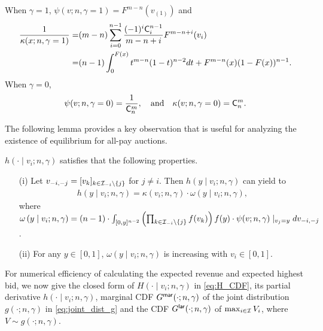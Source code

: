\begin{corollary}\label{cor:special_gamma}
 When $\gamma=1$, $\psi(v;n,\gamma=1) = F^{m-n}(v_{(1)})$ and 
 \begin{align*}
     \frac{1}{\kappa(x; n, \gamma = 1)} =& (m-n) \sum_{i=0}^{n-1}\frac{(-1)^i\mathsf{C}^{n-1}_i}{m-n+i} F^{m-n+i}(v_i)\\
     =&  (n-1)\int_0^{F(x)}t^{m-n}(1-t)^{n-2}dt + F^{m-n}(x)(1-F(x))^{n-1}.
 \end{align*}
 When $\gamma=0$,
 \begin{align*}
   \psi(v;n,\gamma=0) = \frac{1}{\mathsf{C}^m_n},\quad \textrm{and} \quad
   \kappa(v;n,\gamma=0) = \mathsf{C}^m_n.
 \end{align*}
\end{corollary}

The following lemma provides a key observation that is useful for analyzing the existence of equilibrium for all-pay auctions.

\begin{lemma}
\label{lem:property_h} $h(\cdot\mid v_i;n,\gamma)$ satisfies that the following properties.

\begin{enumerate}
    \item[(i)] Let $v_{-i,-j}=[v_k]_{k\in \mathcal{I}_{-i}\setminus\{j\}}$ for $j\neq i$. Then $h(y\mid v_i;n, \gamma)$ can yield to
  \begin{align*}
      h(y\mid v_i;n, \gamma) =  \kappa(v_i;n,\gamma)
 \cdot \omega\left(y\mid v_i; n, \gamma\right),
  \end{align*}
where $\omega\left(y \mid v_i; n, \gamma\right) = (n-1)\cdot\int_{[0,y]^{n-2}}
\left(\prod_{k\in \mathcal{I}_{-i}\setminus \{j\}} f(v_k)\right)f(y)
 \cdot 
\psi(v;n,\gamma)\mid _{v_j = y}dv_{-i, -j}$.
\item[(ii)] For any $y \in [0,1]$, $\omega\left(y\mid v_i; n, \gamma\right)$ is increasing with $v_i \in [0,1]$.
\end{enumerate}
\end{lemma}



For numerical efficiency of calculating the expected revenue and expected highest bid, we now give the closed form of $H(\cdot\mid v_i;n,\gamma)$ in \eqref{eq:H_CDF}, its partial derivative $h(\cdot\mid v_i;n,\gamma)$, marginal CDF $G^{\mathsf{mar}}(\cdot; n,\gamma)$ of the joint distribution $g(\cdot;n,\gamma)$ in \eqref{eq:joint_dist_g} and the CDF $G^{\mathsf{lar}}(\cdot;n,\gamma)$ of $\max_{i\in\mathcal{I}}V_i$, where $V\sim g(\cdot;n,\gamma)$.

